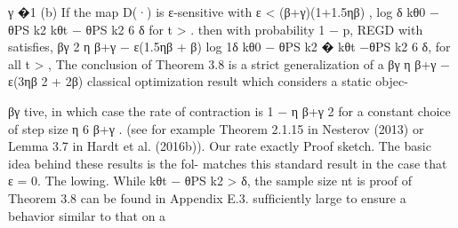 \documentclass[10pt]{article}
\begin{document}
\begin{ReviewVerbatim}
                                                                                                                                 γ
                                               �1                             (b) If the map D(·) is ε-sensitive with ε < (β+γ)(1+1.5ηβ)  ,
                                         log    δ kθ0 − θPS k2
     kθt − θPS k2 6 δ for t >                                             .       then with probability 1 − p, REGD with satisﬁes,
                                          βγ          2
                                 η       β+γ − ε(1.5ηβ + β)
                                                                                                                    log 1δ kθ0 − θPS k2
                                                                                                                        �
                                                                                  kθt −θPS k2 6 δ, for all t >                              ,
The conclusion of Theorem 3.8 is a strict generalization of a                                                        βγ
                                                                                                                 η β+γ    − ε(3ηβ 2 + 2β)
classical optimization result which considers a static objec-

                                                        βγ
tive, in which case the rate of contraction is 1 − η β+γ                                                                   2
                                                                                   for a constant choice of step size η 6 β+γ .
(see for example Theorem 2.1.15 in Nesterov (2013) or
Lemma 3.7 in Hardt et al. (2016b)). Our rate exactly                          Proof sketch. The basic idea behind these results is the fol-
matches this standard result in the case that ε = 0. The                      lowing. While kθt − θPS k2 > δ, the sample size nt is
proof of Theorem 3.8 can be found in Appendix E.3.                            sufﬁciently large to ensure a behavior similar to that on a
\end{ReviewVerbatim}
\end{document}
